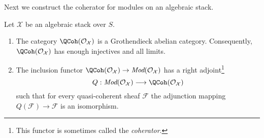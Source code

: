 \noindent
Next we construct the coherator for modules on an algebraic stack.

\begin{proposition}
\label{proposition-coherator}
Let $\mathcal{X}$ be an algebraic stack over $S$.
\begin{enumerate}
\item The category $\QCoh(\mathcal{O}_\mathcal{X})$ is a Grothendieck
abelian category. Consequently, $\QCoh(\mathcal{O}_\mathcal{X})$
has enough injectives and all limits.
\item The inclusion functor
$\QCoh(\mathcal{O}_\mathcal{X}) \to
\textit{Mod}(\mathcal{O}_\mathcal{X})$ has a right adjoint\footnote{This
functor is sometimes called the {\it coherator}.}
$$
Q :
\textit{Mod}(\mathcal{O}_\mathcal{X})
\longrightarrow
\QCoh(\mathcal{O}_\mathcal{X})
$$
such that for every quasi-coherent sheaf $\mathcal{F}$ the adjunction mapping
$Q(\mathcal{F}) \to \mathcal{F}$ is an isomorphism.
\end{enumerate}
\end{proposition}


